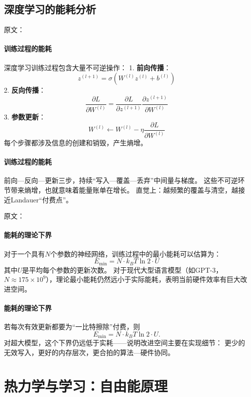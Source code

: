 \subsection{深度学习的能耗分析}

原文：
\paragraph{训练过程的能耗}
深度学习训练过程包含大量不可逆操作：
1. \textbf{前向传播}：
   $$z^{(l+1)} = \sigma(W^{(l)} z^{(l)} + b^{(l)})$$
2. \textbf{反向传播}：
   $$\frac{\partial L}{\partial W^{(l)}} = \frac{\partial L}{\partial z^{(l+1)}} \frac{\partial z^{(l+1)}}{\partial W^{(l)}}$$
3. \textbf{参数更新}：
   $$W^{(l)} \leftarrow W^{(l)} - \eta \frac{\partial L}{\partial W^{(l)}}$$
每个步骤都涉及信息的创建和销毁，产生熵增。
\paragraph{训练过程的能耗}
前向—反向—更新三步，持续“写入—覆盖—丢弃”中间量与梯度。  
这些不可逆环节带来熵增，也就意味着能量账单在增长。  
直觉上：越频繁的覆盖与清空，越接近Landauer“付费点”。

原文：
\paragraph{能耗的理论下界}
对于一个具有$N$个参数的神经网络，训练过程中的最小能耗可以估算为：
$$E_{\min} = N \cdot k_B T \ln 2 \cdot U$$
其中$U$是平均每个参数的更新次数。
对于现代大型语言模型（如GPT-3，$N \approx 175 \times 10^9$），理论最小能耗仍然远小于实际能耗，表明当前硬件效率有巨大改进空间。
\paragraph{能耗的理论下界}
若每次有效更新都要为“一比特擦除”付费，则
$$E_{\min}=N\cdot k_BT\ln2\cdot U.$$
对超大模型，这个下界仍远低于实耗——\;说明改进空间主要在实现细节：  
更少的无效写入，更好的内存层次，更合拍的算法—硬件协同。




\section{热力学与学习：自由能原理}

